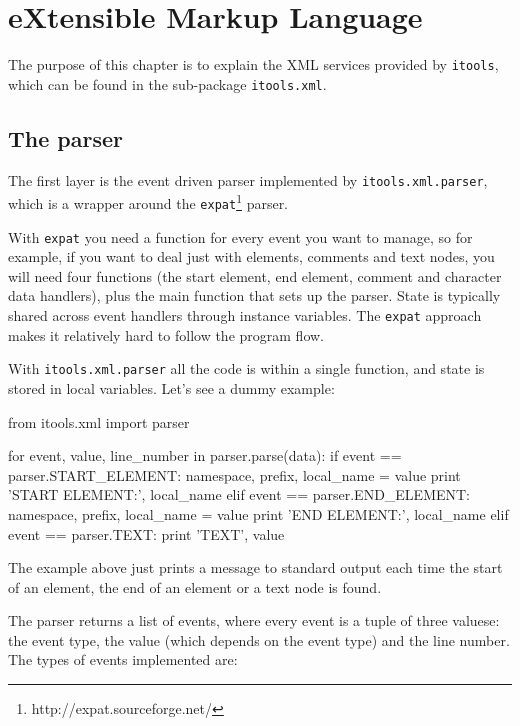 \chapter{eXtensible Markup Language}

The purpose of this chapter is to explain the XML services provided by
{\tt itools}, which can be found in the sub-package {\tt itools.xml}.


\section{The parser}

The first layer is the event driven parser implemented by
{\tt itools.xml.parser}, which is a wrapper around the
{\tt expat}\footnote{http://expat.sourceforge.net/} parser.

With {\tt expat} you need a function for every event you want to manage,
so for example, if you want to deal just with elements, comments and text
nodes, you will need four functions (the start element, end element, comment
and character data handlers), plus the main function that sets up the
parser. State is typically shared across event handlers through instance
variables. The {\tt expat} approach makes it relatively hard to follow the
program flow.

With {\tt itools.xml.parser} all the code is within a single function, and
state is stored in local variables. Let's see a dummy example:

\begin{code}
    from itools.xml import parser

    for event, value, line_number in parser.parse(data):
        if event == parser.START_ELEMENT:
            namespace, prefix, local_name = value
            print 'START ELEMENT:', local_name
        elif event == parser.END_ELEMENT:
            namespace, prefix, local_name = value
            print 'END ELEMENT:', local_name
        elif event == parser.TEXT:
            print 'TEXT', value
\end{code}

The example above just prints a message to standard output each time the
start of an element, the end of an element or a text node is found.

The parser returns a list of events, where every event is a tuple of three
valuese: the event type, the value (which depends on the event type) and
the line number. The types of events implemented are:

